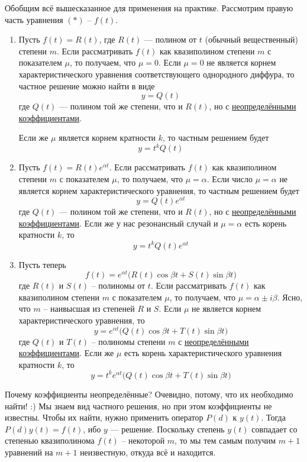 \documentclass[a4paper,12pt]{article}
\begin{document}
Обобщим всё вышесказанное для применения на практике.
Рассмотрим правую часть уравнения $(*)$ -- $f(t)$.
\begin{enumerate}
	\item Пусть $f(t) = R(t)$, где $R(t)$ --- полином от $t$ (обычный вещественный) степени $m$. Если рассматривать $f(t)$ как квазиполином степени $m$ с показателем $\mu$, то получаем, что $\mu = 0$. Если $\mu = 0$ не является корнем характеристического уравнения соответствующего однородного диффура, то частное решение можно найти в виде 
	\[y = Q(t)\] где $Q(t)$ --- полином той же степени, что и $R(t)$, но с \underline{неопределёнными коэффициентами}. 
	
	Если же $\mu$ является корнем кратности $k$, то частным решением будет \[y = t^kQ(t)\]
	
	\item Пусть $f(t) = R(t)e^{\alpha t}$. Если рассматривать $f(t)$ как квазиполином степени $m$ с показателем $\mu$, то получаем, что $\mu = \alpha$. Если число $\mu = \alpha$ не является корнем характеристического уравнения, то частным решением будет
	\[y = Q(t)e^{\alpha t}\]
	где $Q(t)$ --- полином той же степени, что и $R(t)$, но с \underline{неопределёнными коэффициентами}. 
	Если же у нас резонансный случай и  $\mu  = \alpha $ есть корень кратности $k$, то 
	\[y = t^kQ(t)e^{\alpha t}\]
	
	\item Пусть теперь 
	\[f(t) = e^{\alpha t}\big(R(t)\cos \beta t + S(t)\sin \beta t\big)\] где $R(t)$ и $S(t)$ -- полиномы от $t$. Если рассматривать $f(t)$ как квазиполином степени $m$ с показателем $\mu$, то получаем, что $\mu = \alpha \pm i\beta$. Ясно, что $m$ -- наивысшая из степеней $R$ и $S$. Если $\mu$ не является корнем характеристического уравнения, то
	\[y = e^{\alpha t}\big(Q(t)\cos \beta t + T(t)\sin \beta t\big)\] где $Q(t)$ и $T(t)$ -- полиномы степени $m$ с \underline{неопределёнными коэффициентами}. Если же $\mu$ есть корень характеристического уравнения кратности $k$, то 
	\[y = t^ke^{\alpha t}\big(Q(t)\cos \beta t + T(t)\sin \beta t\big)\]
\end{enumerate}
Почему коэффициенты неопределённые? 
Очевидно, потому, что их необходимо найти! :)
Мы знаем вид частного решения, но при этом коэффициенты не известны. 
Чтобы их найти, нужно применить оператор $P(d)$ к $y(t)$.
Тогда $P(d)y(t) = f(t)$, ибо $y$ --- решение.
Поскольку степень $y(t)$ совпадает со степенью квазиполинома $f(t)$ -- некоторой $m$, то мы тем самым получим $m + 1$ уравнений на $m + 1$ неизвестную, откуда всё и находится.
\ \\
\end{document}
